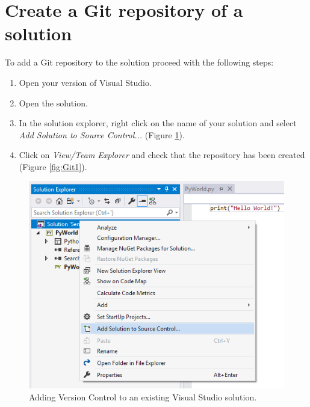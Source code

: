     
    \section{Create a Git repository of a solution}

To add a Git repository to the solution proceed with the following steps:

\begin{enumerate}
    \item Open your version of Visual Studio.
    \item Open the solution.
    \item In the solution explorer, right click on the name of your solution and select \textit{Add Solution to Source Control...} (Figure \ref{fig:Git0}).
    \item Click on \textit{View/Team Explorer} and check that the repository has been created (Figure \ref{fig:Git1}).
\end{enumerate}

\begin{figure}[h]
    \centering
    \includegraphics[width=0.7 \textwidth]{Figures/G0V1.png}
    \caption{Adding Version Control to an existing Visual Studio solution.}
    \label{fig:Git0}
\end{figure}


